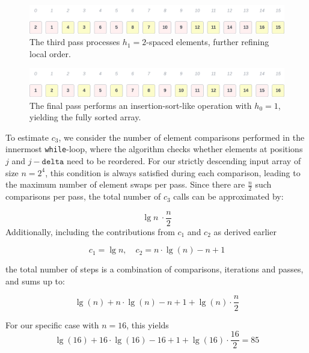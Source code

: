 \begin{figure}[!h]
    \centering
    \includegraphics[width=1\columnwidth]{img/bestcase-it3}
    \caption{The third pass processes $h_1 = 2$-spaced elements, further refining local order.}
    \label{fig:bestcase-it3}
\end{figure}

\begin{figure}[!h]
    \centering
    \includegraphics[width=1\columnwidth]{img/bestcase-it4}
    \caption{The final pass performs an insertion-sort-like operation with $h_0 = 1$, yielding the fully sorted array.}
    \label{fig:bestcase-it4}
\end{figure}

To estimate $c_3$, we consider the number of element comparisons performed in the innermost \texttt{while}-loop, where the algorithm checks whether elements at positions $j$ and $j - \texttt{delta}$ need to be reordered.
For our strictly descending input array of size $n = 2^4$, this condition is always satisfied during each comparison, leading to the maximum number of element swaps per pass.
Since there are $\frac{n}{2}$ such comparisons per pass, the total number of $c_3$ calls can be approximated by:

\[
    \lg n\ \cdot \frac{n}{2}
\]
\noindent
Additionally, including the contributions from $c_1$ and $c_2$ as derived earlier

\[
    c_1 = \lg n, \quad
    c_2 = n \cdot \lg(n) - n + 1
\]

\noindent
the total number of steps is a combination of comparisons, iterations and passes, and sums up to:

\[
    \lg(n) + n \cdot \lg(n) - n + 1 + \lg(n) \cdot \frac{n}{2}
\]

\noindent
For our specific case with $n = 16$, this yields
\[
    \lg(16) + 16 \cdot \lg(16) - 16 + 1 +  \lg(16) \cdot \frac{16}{2} = 85
\]


